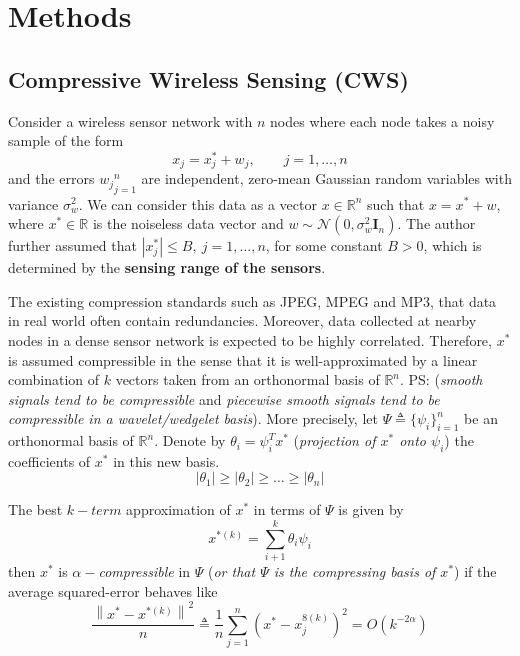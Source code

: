 \chapter{Methods}
\section{Compressive Wireless Sensing (CWS)}

Consider a wireless sensor network with $n$ nodes where each node takes a noisy sample of the form
\begin{equation}
    x_{j} = x^{*}_{j} + w_{j}, \qquad j = 1,\dots,n
    \label{eq2.1.3}
\end{equation}
and the errors ${w_j}_{j=1}^n$ are independent, zero-mean Gaussian random variables with variance $\sigma_w^2$. We can consider this data as a vector $x \in \mathbb{R}^{n}$ such that $x = x^*+w$, where $x^* \in \mathbb{R}$ is the noiseless data vector and $w \sim \mathcal{N}(0,\sigma^2_w\mathbf{I}_n)$. The author further assumed that $\left|x_j^*\right| \leq B, \ j=1,\dots,n$, for some constant $B > 0$, which is determined by the \textbf{\textcolor[rgb]{1,0,0}{sensing range of the sensors}}.

The existing  compression standards such as JPEG, MPEG and MP3, that data in real world often contain redundancies. Moreover, data collected at nearby nodes in a dense sensor network is expected to be highly correlated. Therefore, $x^*$ is assumed compressible in the sense that it is well-approximated by a linear combination of $k$ vectors taken from an orthonormal basis of $\mathbb{R}^n$. PS: (\emph{\textcolor[rgb]{1,0,0}{smooth signals tend to be compressible}} and \emph{\textcolor[rgb]{1,0,0}{piecewise smooth signals tend to be compressible in a wavelet/wedgelet basis}}). More precisely, let $\Psi \triangleq \{\psi_i\}^n_{i=1}$ be an orthonormal basis of $\mathbb{R}^n$. Denote by $\theta_i = \psi^T_i x^*$ (\emph{\textcolor[rgb]{1,0,0}{projection of $x^*$ onto $\psi_i$}}) the coefficients of $x^*$ in this new basis.
\begin{equation}
    |\theta_1| \geq |\theta_2| \geq \dots \geq |\theta_n|
    \label{eq2.1.4}
\end{equation}

The best $k-term$ approximation of $x^*$ in terms of $\Psi$ is given by 
\begin{equation}
    x^{*(k)} = \sum\limits_{i+1}^{k}\theta_i\psi_i 
    \label{eq2.1.5}
\end{equation}
then $x^*$ is \emph{\textcolor[rgb]{1,0,0}{$\alpha-$compressible}} in $\Psi$ (\emph{\textcolor[rgb]{1,0,0}{or that $\Psi$ is the compressing basis of $x^*$}}) if the \textcolor[rgb]{1,0,0}{average squared-error} behaves like
\begin{equation}
    \dfrac{\left\|x^*-x^{*(k)}\right\|^2}{n} \triangleq \dfrac{1}{n} \sum\limits_{j=1}^{n}\left( x^* - x_j^{8(k)} \right)^2 = O (k^{-2\alpha})
    \label{eq2.1.6}
\end{equation} 
